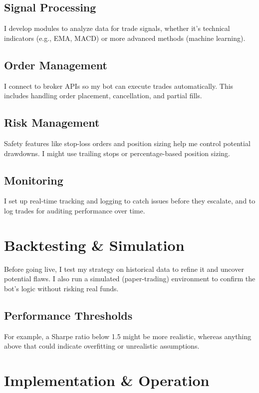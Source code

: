 \documentclass[9pt,a4paper,twocolumn,twoside]{tau-class/tau}
\begin{document}
\subsection{Signal Processing}
I develop modules to analyze data for trade signals, whether it's technical 
indicators (e.g., EMA, MACD) or more advanced methods (machine learning). 

\subsection{Order Management}
I connect to broker APIs so my bot can execute trades automatically. This 
includes handling order placement, cancellation, and partial fills.

\subsection{Risk Management}
Safety features like stop-loss orders and position sizing help me control 
potential drawdowns. I might use trailing stops or percentage-based 
position sizing.

\subsection{Monitoring}
I set up real-time tracking and logging to catch issues before they escalate, 
and to log trades for auditing performance over time.

\section{Backtesting \& Simulation}

Before going live, I test my strategy on historical data to refine it and 
uncover potential flaws. I also run a simulated (paper-trading) environment 
to confirm the bot’s logic without risking real funds. 

\subsection{Performance Thresholds}
For example, a Sharpe ratio below 1.5 might be more realistic, whereas 
anything above that could indicate overfitting or unrealistic assumptions.

\section{Implementation \& Operation}
\end{document}
